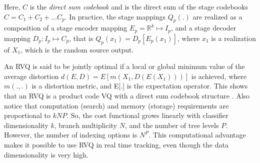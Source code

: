\documentclass{article}
\begin{document}
Here, $C$ is the \emph{direct sum codebook} and is the direct sum of the stage codebooks $C=C_1 + C_2 + \ldots C_p$.  
In practice, the stage mappings $Q_p(.)$ are realized as a composition of a stage encoder mapping $E_p = \mathbb{R}^k \mapsto I_p$, and a stage decoder mapping $D_p: I_p \mapsto C_p$, that is $Q_p(x_1) = D_p[E_p(x_1)]$, where $x_1$ is a realization of $X_1$, which is the random source output.  


An RVQ is said to be jointly optimal if a local or global minimum value of the average distortion $d(E,D) = E[m(X_1, D(E(X_1)))]$ is achieved, where $m(.,.)$ is a distortion metric, and E[.] is the expectation operator.  This shows that an RVQ is a product code VQ with a direct sum codebook structure \cite{1993_JNL_RVQDSC_Barnes}.  Also notice that computation (search) and memory (storage) requirements are proportional to $kNP$.  So, the cost functional grows linearly with classifier dimensionality $k$, branch multiplicity $N$, and the number of tree levels $P$.  However, the number of indexing options is $N^P$.  This computational advantage makes it possible to use RVQ in real time tracking, even though the data dimensionality is very high.


\end{document}
